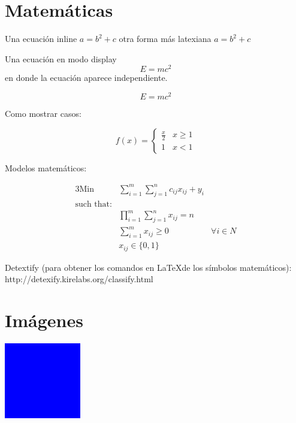\section{Matemáticas}

Una ecuación inline $a = b^2 + c$ otra forma más latexiana \(a = b^2 + c\)

Una ecuación en modo display \[E = mc^2\] en donde la ecuación aparece independiente.

\begin{equation}
	E = mc^2 \label{eq:relativo}
\end{equation}

Como mostrar casos:

\begin{equation}
	f(x) = 
	\begin{cases}
		\frac{x}{2}	& x \geq 1 \\
		1			& x < 1
	\end{cases}
\end{equation}

Modelos matemáticos:

\begin{alignat}{3}
	\text{Min } & \sum_{i = 1}^{m} \sum_{j = 1}^{n} c_{ij}x_{ij} + y_{i} \\
	\text{such that:} \nonumber \\
				& \prod_{i = 1}^{m} \sum_{j = 1}^{n} x_{ij} = n\\ \label{eq:restr2}
				& \sum_{i = 1}^{m} x_{ij} \geq 0 &\forall i \in N\\
				&x_{ij} \in \{0,1\}
\end{alignat}

Detextify (para obtener los comandos en \LaTeX de los símbolos matemáticos): http://detexify.kirelabs.org/classify.html

\section{Imágenes}

\begin{center}
	\includegraphics[width =0.25\textwidth]{./img/blue.png}
\end{center}

